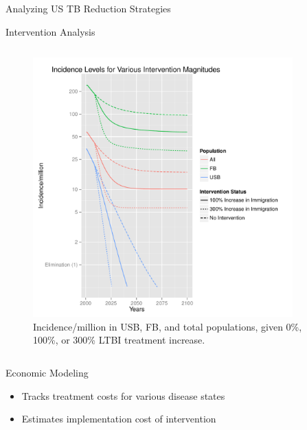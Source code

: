 \documentclass[final]{beamer}
\begin{document}
\begin{frame}
\begin{columns}
\begin{column}{.3\textwidth}
\begin{block}{Analyzing US TB Reduction Strategies}
\begin{block}{Intervention Analysis}
\begin{column}{.45\textwidth}
\begin{figure}[h]
              \begin{center}
                \includegraphics[height=10cm,width=\textwidth]{incLTBItrmtIncGrouped}
              \end{center}
              \caption{Incidence/million in USB, FB, and total populations,
                       given 0\%, 100\%, or 300\% LTBI treatment increase.}
              \label{fig:incLTBItrmt_incidence}
            \end{figure}
          \end{column}
        \end{block}
      \end{block}
      \begin{block}{Economic Modeling}
        \begin{itemize}
          \item Tracks treatment costs for various disease states
          \item Estimates implementation cost of intervention
        \end{itemize}
        \begin{block}{}
          \vspace{-4em}
          \begin{column}{.66\textwidth}
            \begin{figure}[h]
              \begin{center}

\end{center}
\end{figure}
\end{column}
\end{block}
\end{block}
\end{column}
\end{columns}
\end{frame}
\end{document}

